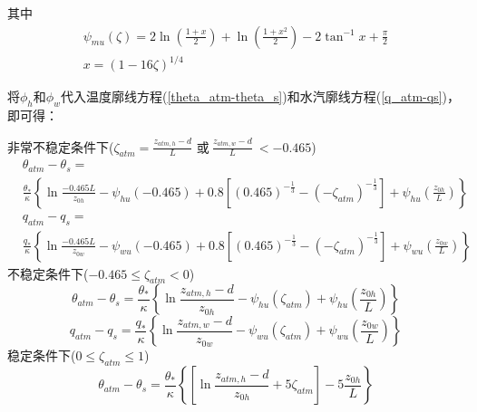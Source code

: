 \noindent 其中
\begin{equation}\label{Psim}
\begin{array}{c}\psi_{mu}\left(\zeta\right)=2\ln{(\frac{1+x}{2})}+\ln{\left(\frac{1+x^2}{2}\right)-2}\tan^{-1}{x}+\frac{\pi}{2} \\
      x={(1-16\zeta)}^{1/4}\end{array}
\end{equation}

将$\phi_h$和$\phi_w$代入温度廓线方程(\ref{theta_atm-theta_s})和水汽廓线方程(\ref{q_atm-qs})，即可得：

\noindent 非常不稳定条件下($\zeta_{atm}=\frac{z_{atm,h}-d}{L}$ 或$ \ \frac{z_{atm,w}-d}{L}\ <-0.465$)
\begin{equation}\label{theta_VU}
\begin{aligned}
&\theta_{atm}-\theta_{s}= \\ 
&\frac{\theta_{*}}{\kappa}\left\{\ln \frac{-0.465 L}{z_{0 h}}-\psi_{hu}(-0.465)+0.8\left[(0.465)^{-\frac{1}{3}}-\left(-\zeta_{atm}\right)^{-\frac{1}{3}}\right]
     +\psi_{hu}\left(\frac{z_{0 h}}{L}\right)\right\}
\end{aligned}
\end{equation}
\begin{equation}\label{q_VU}
\begin{aligned}
&q_{atm}-q_{s}= \\ 
&\frac{q_{*}}{\kappa}\left\{\ln \frac{-0.465 L}{z_{0 w}}-\psi_{wu}(-0.465)+0.8\left[(0.465)^{-\frac{1}{3}}-
     \left(-\zeta_{atm}\right)^{-\frac{1}{3}}\right]+\psi_{wu}\left(\frac{z_{0 w}}{L}\right)\right\}
\end{aligned}
\end{equation}
不稳定条件下($-0.465\leqslant\zeta_{atm}<0$)
\begin{equation}
\theta_{atm}-\theta_{s}=\frac{\theta_{*}}{\kappa}\left\{\ln \frac{z_{atm, h}-d}{z_{0 h}}-\psi_{hu}
\left(\zeta_{atm}\right)+\psi_{hu}\left(\frac{z_{0 h}}{L}\right)\right\}
\end{equation}
\begin{equation}
q_{atm}-q_{s}=\frac{q_{*}}{\kappa}\left\{\ln \frac{z_{atm, w}-d}{z_{0 w}}-
\psi_{wu}\left(\zeta_{atm}\right)+\psi_{wu}\left(\frac{z_{0 w}}{L}\right)\right\}
\end{equation}
稳定条件下($0\leqslant\zeta_{atm}\leqslant1$)
\begin{equation}
\theta_{atm}-\theta_{s}=\frac{\theta_{*}}{\kappa}\left\{\left[\ln \frac{z_{atm, h}-d}{z_{0 h}}+5 \zeta_{atm}\right]-5 \frac{z_{0 h}}{L}\right\}
\end{equation}
